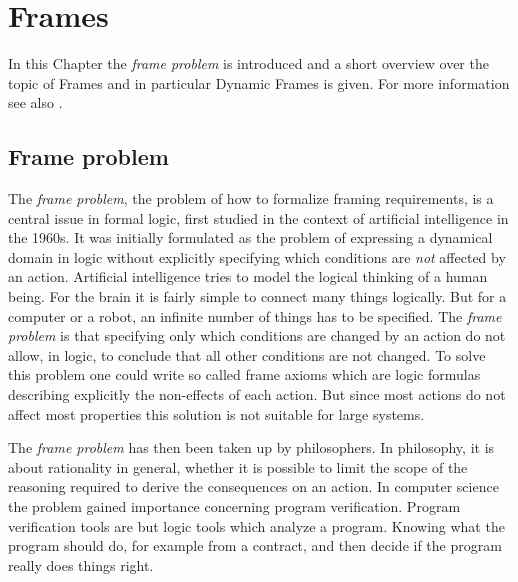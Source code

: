 \chapter{Frames}
\label{sec:Frames}

In this Chapter the \emph{frame problem} is introduced and a short overview over the topic of Frames and in particular Dynamic Frames is given. For more information see also \cite{Kassios06Dynamic, SchoellerDynamic, Schoeller06Eiffel0}.

\section{Frame problem}
\label{sec:FrameProblem}

The \emph{frame problem}, the problem of how to formalize framing requirements, is a central issue in formal logic, first studied in the context of artificial intelligence in the 1960s. It was initially formulated as the problem of expressing a dynamical domain in logic without explicitly specifying which conditions are \emph{not} affected by an action. Artificial intelligence tries to model the logical thinking of a human being. For the brain it is fairly simple to connect many things logically. But for a computer or a robot, an infinite number of things has to be specified. The \emph{frame problem} is that specifying only which conditions are changed by an action do not allow, in logic, to conclude that all other conditions are not changed. To solve this problem one could write so called frame axioms which are logic formulas describing explicitly the non-effects of each action. But since most actions do not affect most properties this solution is not suitable for large systems.

The \emph{frame problem} has then been taken up by philosophers. In philosophy, it is about rationality in general, whether it is possible to limit the scope of the reasoning required to derive the consequences on an action. In computer science the problem gained importance concerning program verification. Program verification tools are but logic tools which analyze a program. Knowing what the program should do, for example from a contract, and then decide if the program really does things right.

